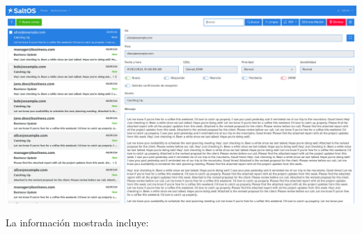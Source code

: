 \documentclass[a4paper]{article}
\begin{document}
\begin{center}\includegraphics[width=1\textwidth]{../ujest/snaps/test-screenshots-js-screenshots-emails-emails-view-100-es-es-1-snap.png}\end{center}

La información mostrada incluye:
\end{document}
